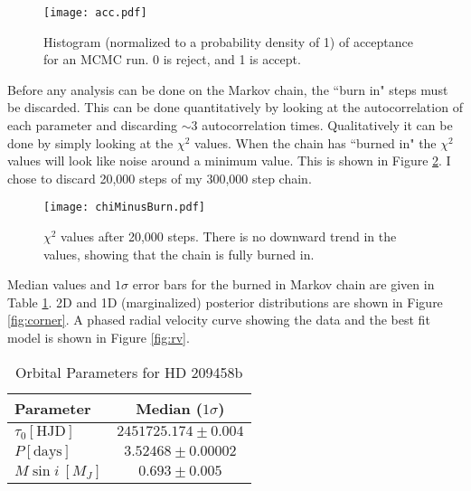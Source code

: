 \documentclass[11pt]{paper}
\begin{document}
\begin{figure}
\begin{center}
    \texttt{[image: acc.pdf]}
    \caption{Histogram (normalized to a probability density of 1) of acceptance for an MCMC run. 0 is reject, and 1 is accept.}
    \label{fig:acchist}
\end{center}
\end{figure}

Before any analysis can be done on the Markov chain, the ``burn in" steps must be discarded. This can be done quantitatively by looking at the autocorrelation of each parameter and discarding $\sim3$ autocorrelation times. Qualitatively it can be done by simply looking at the $\chi^2$ values. When the chain has ``burned in" the $\chi^2$ values will look like noise around a minimum value. This is shown in Figure \ref{fig:chi}. I chose to discard 20,000 steps of my 300,000 step chain. 

\begin{figure}
\begin{center}
    \texttt{[image: chiMinusBurn.pdf]}
    \caption{$\chi^2$ values after 20,000 steps. There is no downward trend in the values, showing that the chain is fully burned in.}
    \label{fig:chi}
\end{center}
\end{figure}

Median values and $1\sigma$ error bars for the burned in Markov chain are given in Table \ref{tab:bf}. 2D and 1D (marginalized) posterior distributions are shown in Figure \ref{fig:corner}. A phased radial velocity curve showing the data and the best fit model is shown in Figure \ref{fig:rv}. 

\begin{table}
    \begin{center}
        \caption{Orbital Parameters for HD 209458b}\label{tab:bf}
        \begin{tabular}{lc}
            \hline\hline
            Parameter & Median ($1\sigma$) \\
            \hline
            $\tau_0 [\mathrm{HJD}]$ & $2451725.174\pm0.004$ \\
            $P [\mathrm{days}]$ & $3.52468\pm0.00002$ \\
            $M\sin i~[M_J]$ & $0.693\pm0.005$ \\
            \hline
        \end{tabular}
    \end{center}
\end{table}
\end{document}
